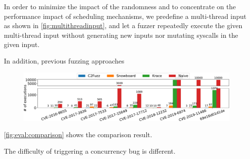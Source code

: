 In order to minimize the impact of the randomness and to concentrate
on the performance impact of scheduling mechanisms, we predefine a
multi-thread input as shown in \autoref{fig:multithreadinput}, and let
a fuzzer repeatedly execute the given multi-thread input without
generating new inputs nor mutating syscalls in the given input.

In addition, previous fuzzing approaches


\PP{}
%
\begin{figure}[t]
  \centering
  \includegraphics[width=\linewidth]{fig/comparison_graph-crop.pdf}
  \caption{ }
  \label{fig:eval:comparison}
\end{figure}
%

\autoref{fig:eval:comparison} shows the comparison result.
%



The difficulty of triggering a concurrency bug is different.









